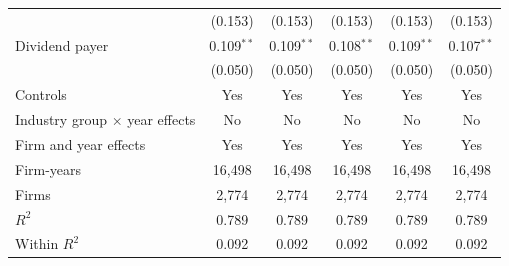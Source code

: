 \begin{tabular}{lccccc}
 & (0.153) & (0.153) & (0.153) & (0.153) & (0.153) \\
Dividend payer & 0.109$^{**}$ & 0.109$^{**}$ & 0.108$^{**}$ & 0.109$^{**}$ & 0.107$^{**}$ \\
 & (0.050) & (0.050) & (0.050) & (0.050) & (0.050) \\
\midrule
Controls & Yes & Yes & Yes & Yes & Yes \\
Industry group $\times$ year effects & No & No & No & No & No \\
Firm and year effects & Yes & Yes & Yes & Yes & Yes \\
Firm-years & 16,498 & 16,498 & 16,498 & 16,498 & 16,498 \\
Firms & 2,774 & 2,774 & 2,774 & 2,774 & 2,774 \\
$R^2$ & 0.789 & 0.789 & 0.789 & 0.789 & 0.789 \\
Within $R^2$ & 0.092 & 0.092 & 0.092 & 0.092 & 0.092 \\
\bottomrule
\end{tabular}
